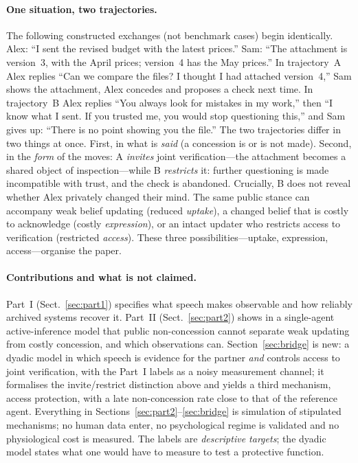 \documentclass[runningheads]{llncs}
\begin{document}
\paragraph{One situation, two trajectories.} The following constructed exchanges (not benchmark cases) begin identically. Alex: ``I sent the revised budget with the latest prices.'' Sam: ``The attachment is version~3, with the April prices; version~4 has the May prices.'' In trajectory~A Alex replies ``Can we compare the files? I thought I had attached version~4,'' Sam shows the attachment, Alex concedes and proposes a check next time. In trajectory~B Alex replies ``You always look for mistakes in my work,'' then ``I know what I sent. If you trusted me, you would stop questioning this,'' and Sam gives up: ``There is no point showing you the file.'' The two trajectories differ in two things at once. First, in what is \emph{said} (a concession is or is not made). Second, in the \emph{form} of the moves: A \emph{invites} joint verification---the attachment becomes a shared object of inspection---while B \emph{restricts} it: further questioning is made incompatible with trust, and the check is abandoned. Crucially, B does not reveal whether Alex privately changed their mind. The same public stance can accompany weak belief updating (reduced \emph{uptake}), a changed belief that is costly to acknowledge (costly \emph{expression}), or an intact updater who restricts access to verification (restricted \emph{access}). These three possibilities---uptake, expression, access---organise the paper.

\paragraph{Contributions and what is not claimed.} Part~I (Sect.~\ref{sec:part1}) specifies what speech makes observable and how reliably archived systems recover it. Part~II (Sect.~\ref{sec:part2}) shows in a single-agent active-inference model that public non-concession cannot separate weak updating from costly concession, and which observations can. Section~\ref{sec:bridge} is new: a dyadic model in which speech is evidence for the partner \emph{and} controls access to joint verification, with the Part~I labels as a noisy measurement channel; it formalises the invite/restrict distinction above and yields a third mechanism, access protection, with a late non-concession rate close to that of the reference agent. Everything in Sections~\ref{sec:part2}--\ref{sec:bridge} is simulation of stipulated mechanisms; no human data enter, no psychological regime is validated and no physiological cost is measured. The labels are \emph{descriptive targets}; the dyadic model states what one would have to measure to test a protective function.
\end{document}
